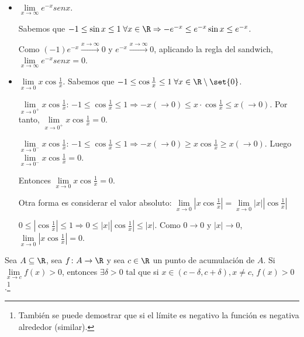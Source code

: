 \begin{example}
	\begin{itemize}
		\item \(\lim\limits_{x  \to \infty} e^{-x}senx  \).
		      
		      Sabemos que \(-1 \leq \sin x \leq 1 \; \forall x \in \R \Rightarrow - e^{-x} \leq e^{-x} \sin x \leq e^{-x}   \).
		      
		      Como \((-1)e^{-x} \overset{x\to \infty}{\longrightarrow } 0 \) y  \(e^{-x} \overset{x\to \infty}{\longrightarrow } 0 \), aplicando la regla del sandwich, \(\lim\limits_{x  \to \infty} e^{-x}senx  = 0\).
		      
		\item \(\lim\limits_{x  \to 0} x \cos \frac{1}{x }\). Sabemos que \(-1 \leq \cos \frac{1}{x} \leq  1 \;\forall x \in \R \setminus \set{0 }\).
		      
		      \(\lim\limits_{x  \to 0^{+}  } x \cos \frac{1}{x}\): \(-1 \leq \cos \frac{1}{x} \leq  1 \Rightarrow -x (\rightarrow 0)\leq x \cdot \cos \frac{1}{x} \leq x (\rightarrow 0)\). Por tanto, \(\lim\limits_{x \to 0^{+} } x \cos \frac{1}{x} = 0 \).
		      
		      \(\lim\limits_{x \to 0^{-} } x \cos  \frac{1}{x} \): \(-1 \leq \cos \frac{1}{x} \leq 1 \Rightarrow -x (\rightarrow 0)\geq x\cos  \frac{1}{x} \geq x (\rightarrow 0)\). Luego \(\lim\limits_{x  \to 0^{-} } x \cos \frac{1}{x} = 0 \).
		      
		      Entonces \(\lim\limits_{x  \to 0 } x \cos \frac{1}{x} = 0 . \)
		      
		      Otra forma es considerar el valor absoluto: \(\lim\limits_{x  \to 0 } \left\vert x \cos \frac{1}{x } \right\vert = \lim\limits_{x  \to 0 } \left\vert x 	\right\vert \left\vert \cos  \frac{1}{x } \right\vert \)
		      
		      \(0 \leq \left\vert \cos \frac{1}{x } \right\vert \leq 1 \Rightarrow 0 \leq \left\vert x  \right\vert \left\vert \cos  \frac{1}{x } \right\vert \leq \left\vert x  \right\vert \). Como \(0 \rightarrow 0 \) y \(\left\vert x  \right\vert \rightarrow 0 \), \(\lim\limits_{x  \to 0 } \left\vert x \cos  \frac{1}{x } \right\vert= 0 \).
	\end{itemize}
\end{example}
\begin{proposition}
	\label{limitepositivo}
	Sea \(A \subseteq \R \), sea \(f \colon A \to \R\) y sea \(c \in \R \) un punto de acumulación de \(A \). Si 
	\(
	\lim\limits_{x  \to c } f(x) > 0
	\), 
	entonces \(\exists \delta > 0 \) tal que si \(x \in (c - \delta, c + \delta), x \neq c \), \(f(x) > 0\).\footnote{También se puede demostrar que si el límite es negativo la función es negativa alrededor (similar).}
\end{proposition}
